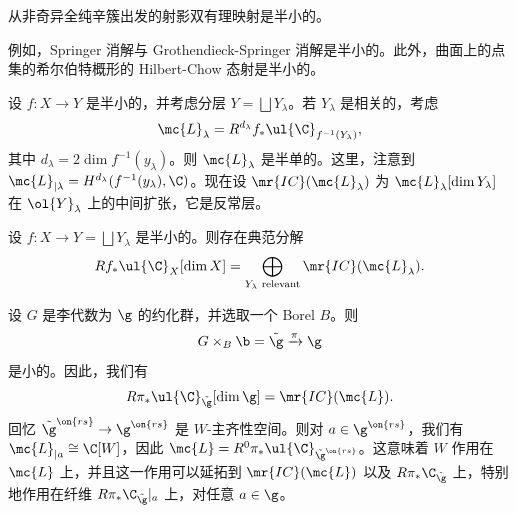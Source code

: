 \begin{thm}
    从非奇异全纯辛簇出发的射影双有理映射是半小的。
\end{thm}

\begin{exm}
    例如，Springer 消解与 Grothendieck-Springer 消解是半小的。此外，曲面上的点集的希尔伯特概形的 Hilbert-Chow 态射是半小的。
\end{exm}

设 \(f \colon X \to Y\) 是半小的，并考虑分层 \(Y = \bigsqcup Y_{\lambda}\)。若 \(Y_{\lambda}\) 是相关的，考虑
\[ \mc{L}_{\lambda} = R^{d_{\lambda}} f_* \ul{\C}_{f^{-1}(Y_{\lambda})}, \]
其中 \(d_{\lambda} = 2 \dim f^{-1} (y_{\lambda})\)。则 \(\mc{L}_{\lambda}\) 是半单的。这里，注意到 \(\mc{L}_{|\lambda} = H^{d_{\lambda}}(f^{-1}(y_{\lambda}), \C)\)。现在设 \(\mr{IC}(\mc{L}_{\lambda})\) 为 \(\mc{L}_{\lambda}[\dim Y_{\lambda}]\) 在 \(\ol{Y}_{\lambda}\) 上的中间扩张，它是反常层。

\begin{thm}
    设 \(f \colon X \to Y = \bigsqcup Y_{\lambda}\) 是半小的。则存在典范分解
    \[ R f_* \ul{\C}_X[\dim X] = \bigoplus_{Y_{\lambda}\text{ relevant}} \mr{IC}(\mc{L}_{\lambda}). \]
\end{thm}

\begin{exm}
    设 \(G\) 是李代数为 \(\g\) 的约化群，并选取一个 Borel \(B\)。则
    \[ G \times_B \b = \tilde{\g} \xrightarrow{\pi} \g \]
    是小的。因此，我们有
    \[ R \pi_* \ul{\C}_{\tilde{\g}} [\dim \g] = \mr{IC}(\mc{L}). \]
    回忆 \(\tilde{\g}^{\on{rs}} \to \g^{\on{rs}}\) 是 \(W\)-主齐性空间。则对 \(a \in \g^{\on{rs}}\)，我们有 \(\mc{L}_{|a} \cong \C[W]\)，因此 \(\mc{L} = R^0 \pi_* \ul{\C}_{\tilde{\g}^{\on{rs}}}\)。这意味着 \(W\) 作用在 \(\mc{L}\) 上，并且这一作用可以延拓到 \(\mr{IC}(\mc{L})\) 以及 \(R \pi_* \C_{\tilde{\g}}\) 上，特别地作用在纤维 \(R \pi_* \C_{\tilde{\g}}|_a\) 上，对任意 \(a \in \g\)。
\end{exm}

